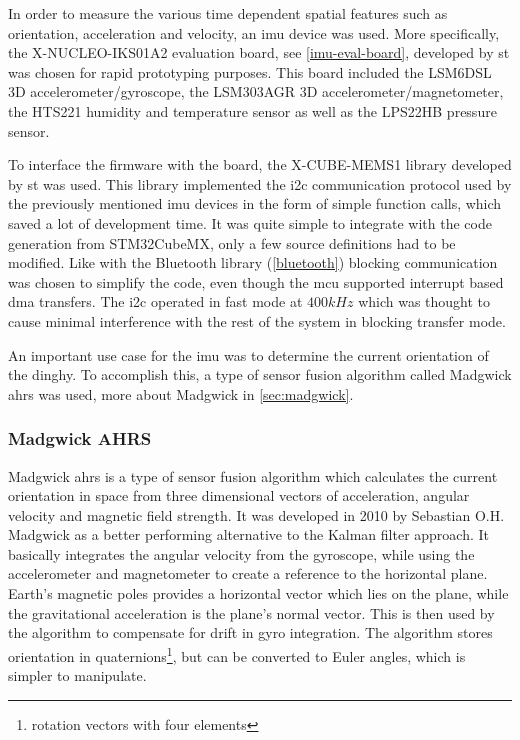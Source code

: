 In order to measure the various time dependent spatial features such as orientation, acceleration and velocity, an \gls{imu} device was used. More specifically, the X-NUCLEO-IKS01A2 \cite{x-nucleo-iks01a2} evaluation board, see \autoref{imu-eval-board}, developed by \gls{st} was chosen for rapid prototyping purposes. This board included the LSM6DSL 3D accelerometer/gyroscope, the LSM303AGR 3D accelerometer/magnetometer, the HTS221 humidity and temperature sensor as well as the LPS22HB pressure sensor.

To interface the firmware with the board, the X-CUBE-MEMS1\cite{x-cube-mems1} library developed by \gls{st} was used. This library implemented the \gls{i2c} communication protocol used by the previously mentioned \gls{imu} devices in the form of simple function calls, which saved a lot of development time. It was quite simple to integrate with the code generation from STM32CubeMX, only a few source definitions had to be modified. Like with the Bluetooth library (\autoref{bluetooth}) blocking communication was chosen to simplify the code, even though the \gls{mcu} supported interrupt based \gls{dma} transfers. The \gls{i2c} operated in fast mode at $400kHz$ which was thought to cause minimal interference with the rest of the system in blocking transfer mode.

An important use case for the \gls{imu} was to determine the current orientation of the dinghy. To accomplish this, a type of sensor fusion algorithm called Madgwick \gls{ahrs} was used, more about Madgwick in \autoref{sec:madgwick}.

\subsubsection{Madgwick AHRS}
\label{sec:madgwick}
Madgwick \gls{ahrs}\cite{madgwick} is a type of sensor fusion algorithm which calculates the current orientation in space from three dimensional vectors of acceleration, angular velocity and magnetic field strength. It was developed in 2010 by Sebastian O.H. Madgwick as a better performing alternative to the Kalman filter approach. It basically integrates the angular velocity from the gyroscope, while using the accelerometer and magnetometer to create a reference to the horizontal plane. Earth’s magnetic poles provides a horizontal vector which lies on the plane, while the gravitational acceleration is the plane’s normal vector. This is then used by the algorithm to compensate for drift in gyro integration. The algorithm stores orientation in quaternions\footnote{rotation vectors with four elements}, but can be converted to Euler angles, which is simpler to manipulate.

